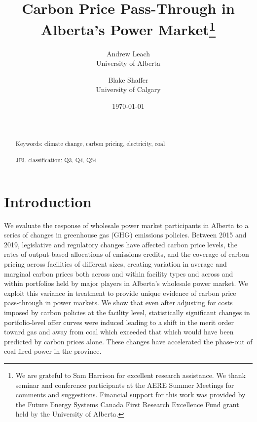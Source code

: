 \documentclass[12pt]{article}
\title{Carbon Price Pass-Through in Alberta's Power Market\thanks{We are grateful to Sam Harrison for excellent
research assistance. We thank seminar and conference participants at the AERE Summer Meetings for comments and suggestions. Financial support for this work was provided by the Future Energy Systems Canada First Research Excellence Fund grant held by the University of Alberta.}
}
\date{\today}
\author{Andrew Leach\\
 University of Alberta
 \and
Blake Shaffer\\University of Calgary}
\begin{document}
\maketitle




\begin{abstract}
\noindent\\ \\
Keywords: climate change, carbon pricing, electricity, coal\\ \\
JEL classification: Q3, Q4, Q54
\end{abstract}

\thispagestyle{empty}
\newpage
\onehalfspacing


\section{Introduction}

We evaluate the response of wholesale power market participants in Alberta to a series of changes in greenhouse gas (GHG) emissions policies.  Between 2015 and 2019, legislative and regulatory changes have affected carbon price levels, the rates of output-based allocations of emissions credits, and the coverage of carbon pricing across facilities of different sizes, creating variation in average and marginal carbon prices both across and within facility types and across and within portfolios held by major players in Alberta's wholesale power market. We exploit this variance in treatment to provide unique evidence of carbon price pass-through in power markets. We show that even after adjusting for costs imposed by carbon policies at the facility level, statistically significant changes in portfolio-level offer curves were induced leading to a shift in the merit order toward gas and away from coal which exceeded that which would have been predicted by carbon prices alone. These changes have accelerated the phase-out of coal-fired power in the province.
\end{document}
